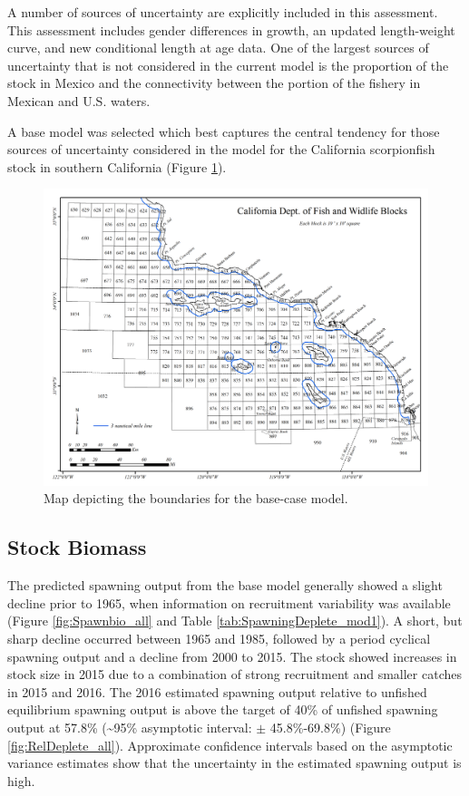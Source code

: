 \documentclass[12pt,]{article}
\begin{document}
A number of sources of uncertainty are explicitly included in this
assessment. This assessment includes gender differences in growth, an
updated length-weight curve, and new conditional length at age data. One
of the largest sources of uncertainty that is not considered in the
current model is the proportion of the stock in Mexico and the
connectivity between the portion of the fishery in Mexican and U.S.
waters.

A base model was selected which best captures the central tendency for
those sources of uncertainty considered in the model for the California
scorpionfish stock in southern California (Figure
\ref{fig:assess_region_map}).

\begin{figure}[htbp]
\centering
\includegraphics{Figures/assess_region_map.png}
\caption{Map depicting the boundaries for the base-case model.
\label{fig:assess_region_map}}
\end{figure}

\FloatBarrier

\subsection*{Stock Biomass}\label{stock-biomass}

The predicted spawning output from the base model generally showed a
slight decline prior to 1965, when information on recruitment
variability was available (Figure \ref{fig:Spawnbio_all} and Table
\ref{tab:SpawningDeplete_mod1}). A short, but sharp decline occurred
between 1965 and 1985, followed by a period cyclical spawning output and
a decline from 2000 to 2015. The stock showed increases in stock size in
2015 due to a combination of strong recruitment and smaller catches in
2015 and 2016. The 2016 estimated spawning output relative to unfished
equilibrium spawning output is above the target of 40\% of unfished
spawning output at 57.8\% (\textasciitilde{}95\% asymptotic interval:
\(\pm\) 45.8\%-69.8\%) (Figure \ref{fig:RelDeplete_all}). Approximate
confidence intervals based on the asymptotic variance estimates show
that the uncertainty in the estimated spawning output is high.
\end{document}
